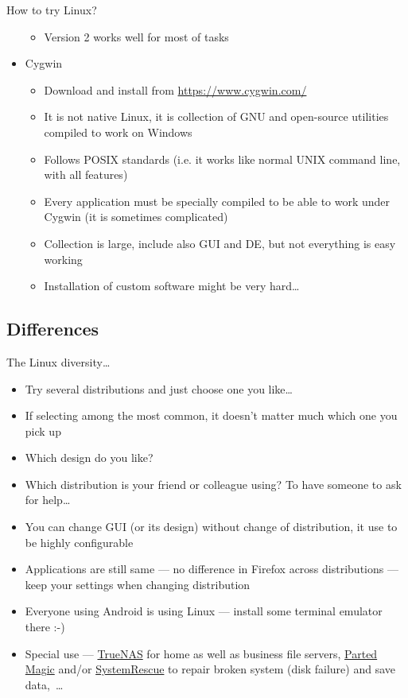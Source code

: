 \documentclass[compress, ucs, xelatex, 11pt, xcolor=svgnames, aspectratio=169,
	hyperref={
		bookmarks=true,
		unicode=true,
		colorlinks=true,
		pdftitle={Linux, command line and MetaCentrum},
		plainpages=false,
		pdfauthor={Vojtech Zeisek},
		pdfsubject={Course about use of Linux command line, writing shell scripts and using MetaCentrum of CESNET},
		pdfcreator={XeLaTeX},
		pdfkeywords={Linux, GNU, BASH, shell, command line, MetaCentrum},
		linkcolor=DarkRed, %
		anchorcolor=DarkBlue, %
		citecolor=Indigo, %
		filecolor=NavyBlue, %
		menucolor=DarkMagenta, %
		urlcolor=DarkBlue, %
		pdftex},
	url={hyphens, lowtilde} %
	]{beamer}
\begin{document}
\begin{frame}[allowframebreaks]{How to try Linux?}
\begin{itemize}
\begin{itemize}
			\item Version 2 works well for most of tasks
		\end{itemize}
		\item Cygwin
		\begin{itemize}
			\item Download and install from \url{https://www.cygwin.com/}
			\item It is not native Linux, it is collection of GNU and open-source utilities compiled to work on Windows
			\item Follows POSIX standards (i.e. it works like normal UNIX command line, with all features)
			\item Every application must be specially compiled to be able to work under Cygwin (it is sometimes complicated)
			\item Collection is large, include also GUI and DE, but not everything is easy working
			\item Installation of custom software might be very hard\ldots
		\end{itemize}
	\end{itemize}
\end{frame}

\subsection{Differences}

\begin{frame}{The Linux diversity\ldots}
	\begin{itemize}
		\item Try several distributions and just choose one you like\ldots
		\item If selecting among the most common, it doesn't matter much which one you pick up
		\item Which design do you like?
		\item Which distribution is your friend or colleague using? To have someone to ask for help\ldots
		\item You can change GUI (or its design) without change of distribution, it use to be highly configurable
		\item Applications are still same --- no difference in Firefox across distributions --- keep your settings when changing distribution
		\item Everyone using Android is using Linux --- install some terminal emulator there :-)
		\item Special use --- \href{https://www.truenas.com/}{TrueNAS} for home as well as business file servers, \href{https://partedmagic.com/}{Parted Magic} and/or \href{https://www.system-rescue.org/}{SystemRescue} to repair broken system (disk failure) and save data,~\ldots
	\end{itemize}
\end{frame}
\end{document}
